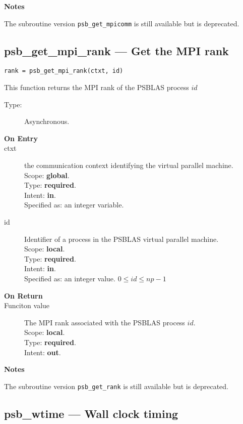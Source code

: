 {\par\noindent\large\bfseries Notes}
The subroutine version \verb|psb_get_mpicomm| is still available but
is deprecated. 

\clearpage\subsection{psb\_get\_mpi\_rank --- Get the MPI rank}

\begin{verbatim}
rank = psb_get_mpi_rank(ctxt, id)
\end{verbatim}

This function returns the MPI rank of the  PSBLAS process $id$
\begin{description}
\item[Type:] Asynchronous.
\item[\bf  On Entry ]
\item[ctxt] the communication context identifying the virtual
  parallel machine.\\
Scope: {\bf global}.\\
Type: {\bf required}.\\
Intent: {\bf in}.\\
Specified as: an integer variable.
\item[id] Identifier of a   process in the PSBLAS virtual parallel machine.\\
Scope: {\bf local}.\\
Type: {\bf required}.\\
Intent: {\bf in}.\\
Specified as: an integer value. $0 \le id \le np-1$\
\end{description}

\begin{description}
\item[\bf On Return]
\item[Funciton value] The MPI rank associated with the  PSBLAS process $id$.\\
Scope: {\bf local}.\\
Type: {\bf required}.\\
Intent: {\bf out}.\\
\end{description}

{\par\noindent\large\bfseries Notes}
The subroutine version \verb|psb_get_rank| is still available but is
deprecated. 



\clearpage\subsection{psb\_wtime --- Wall clock timing}

